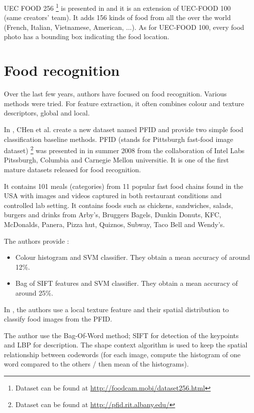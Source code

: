 UEC FOOD 256 \footnote{Dataset can be found at \url{http://foodcam.mobi/dataset256.html}} is presented in \cite{Kawano2015} and it is an extension of UEC-FOOD 100 (same creators' team). It adds 156 kinds of food from all the over the world (French, Italian, Vietnamese, American, ...). As for UEC-FOOD 100, every food photo has a bounding box indicating the food location.

\section{Food recognition}

Over the last few years, authors have focused on food recognition. Various methods were tried. For feature extraction, it often combines colour and texture descriptors, global and local.

In \cite{Chen2009}, CHen et al. create a new dataset named PFID and provide two simple food classification baseline methods. PFID (stands for Pittsburgh fast-food image dataset) \footnote{Dataset can be found at \url{http://pfid.rit.albany.edu/}} was presented in \cite{Chen2009} in summer 2008 from the collaboration of Intel Labs Pitssburgh, Columbia and Carnegie Mellon universitie. It is one of the first mature datasets released for food recognition.

It contains 101 meals (categories) from 11 popular fast food chains found in the USA with images and videos captured in both restaurant conditions and controlled lab setting. It contains foods such as chickens, sandwiches, salads, burgers and drinks from Arby's, Bruggers Bagels, Dunkin Donuts, KFC, McDonalds, Panera, Pizza hut, Quiznos, Subway, Taco Bell and Wendy's.

The authors provide :
\begin{itemize}
    \item Colour histogram and SVM classifier. They obtain a mean accuracy of around 12\%.
    \item Bag of SIFT features and SVM classifier. They obtain a mean accuracy of around 25\%.
\end{itemize}

In \cite{Zong2010}, the authors use a local texture feature and their spatial distribution to classify food images from the PFID.

The author use the Bag-Of-Word method; SIFT for detection of the keypoints and LBP for description. The shape context algorithm is used to keep the spatial relationship between codewords (for each image, compute the histogram of one word compared to the others / then mean of the histograms).


